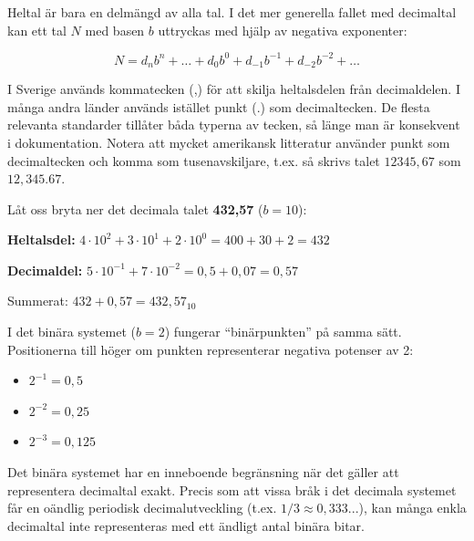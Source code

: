 \documentclass[
  swedish,
  letterpaper,
  oneside,
  openany]{book}
\providecommand{\tightlist}{%
  \setlength{\itemsep}{0pt}\setlength{\parskip}{0pt}}
\begin{document}
Heltal är bara en delmängd av alla tal. I det mer generella fallet med
decimaltal kan ett tal \(N\) med basen \(b\) uttryckas med hjälp av
negativa exponenter:

\[N = d_n b^n + \dots + d_0 b^0 + d_{-1} b^{-1} + d_{-2} b^{-2} + \dots\]

I Sverige används kommatecken (,) för att skilja heltalsdelen från
decimaldelen. I många andra länder används istället punkt (.) som
decimaltecken. De flesta relevanta standarder tillåter båda typerna av
tecken, så länge man är konsekvent i dokumentation. Notera att mycket
amerikansk litteratur använder punkt som decimaltecken och komma som
tusenavskiljare, t.ex. så skrivs talet \(12345,67\) som \(12,345.67\).

\begin{tcolorbox}[enhanced jigsaw, arc=.35mm, bottomrule=.15mm, bottomtitle=1mm, breakable, colback=white, colbacktitle=quarto-callout-note-color!10!white, colframe=quarto-callout-note-color-frame, coltitle=black, left=2mm, leftrule=.75mm, opacityback=0, opacitybacktitle=0.6, rightrule=.15mm, title=\textcolor{quarto-callout-note-color}{\faInfo}\hspace{0.5em}{Exempel: Positionssystemet för 432,57}, titlerule=0mm, toprule=.15mm, toptitle=1mm]

Låt oss bryta ner det decimala talet \textbf{432,57} (\(b=10\)):

\textbf{Heltalsdel:}
\(4 \cdot 10^2 + 3 \cdot 10^1 + 2 \cdot 10^0 = 400 + 30 + 2 = 432\)

\textbf{Decimaldel:}
\(5 \cdot 10^{-1} + 7 \cdot 10^{-2} = 0,5 + 0,07 = 0,57\)

Summerat: \(432 + 0,57 = 432,57_{10}\)

\end{tcolorbox}

I det binära systemet (\(b=2\)) fungerar ``binärpunkten'' på samma sätt.
Positionerna till höger om punkten representerar negativa potenser av 2:

\begin{itemize}
\tightlist
\item
  \(2^{-1} = 0,5\)
\item
  \(2^{-2} = 0,25\)
\item
  \(2^{-3} = 0,125\)
\end{itemize}

Det binära systemet har en inneboende begränsning när det gäller att
representera decimaltal exakt. Precis som att vissa bråk i det decimala
systemet får en oändlig periodisk decimalutveckling (t.ex.
\(1/3 \approx 0,333...\)), kan många enkla decimaltal inte representeras
med ett ändligt antal binära bitar.
\end{document}
